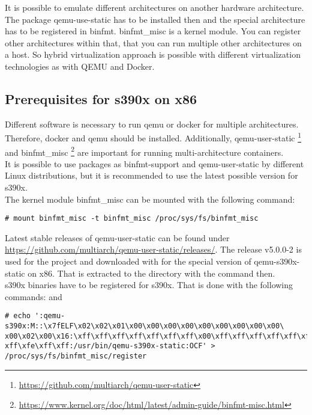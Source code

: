 It is possible to emulate different architectures on another hardware architecture. The package qemu-use-static has to be installed then and the special architecture has to be registered in binfmt. binfmt\_misc is a kernel module. You can register other architectures within that, that you can run multiple other architectures on a host. So hybrid virtualization approach is possible with different virtualization technologies as with QEMU and Docker.

\subsection{Prerequisites for s390x on x86}

Different software is necessary to run qemu or docker for multiple architectures. Therefore, docker and qemu should be installed. Additionally, qemu-user-static \footnote{\url{https://github.com/multiarch/qemu-user-static}} and binfmt\_misc \footnote{\url{https://www.kernel.org/doc/html/latest/admin-guide/binfmt-misc.html}} are important for running multi-architecture containers. \\

It is possible to use packages as binfmt-support and qemu-user-static by different Linux distributions, but it is recommended to use the latest possible version for s390x. \\

The kernel module binfmt\_misc can be mounted with the following command: 
\begin{lstlisting}[style=BashInputStyle]
  # mount binfmt_misc -t binfmt_misc /proc/sys/fs/binfmt_misc
\end{lstlisting}

Latest stable releases of qemu-user-static can be found under \url{https://github.com/multiarch/qemu-user-static/releases/}. The release v5.0.0-2 is used for the project and downloaded with  for the special version of qemu-s390x-static on x86. That is extracted to the directory  with the command  then. \\

s390x binaries have to be registered for s390x. That is done with the following commands:  and \begin{verbatim}
# echo ':qemu-s390x:M::\x7fELF\x02\x02\x01\x00\x00\x00\x00\x00\x00\x00\x00\x00\ 
x00\x02\x00\x16:\xff\xff\xff\xff\xff\xff\xff\x00\xff\xff\xff\xff\xff\xff\xff\xff\
xff\xfe\xff\xff:/usr/bin/qemu-s390x-static:OCF' > /proc/sys/fs/binfmt_misc/register
\end{verbatim}

